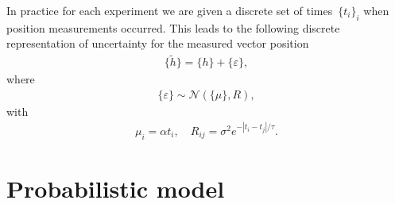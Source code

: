 \documentclass{article}
\begin{document}
In practice for each experiment we are given a discrete set of times~$\{ t_i \}_i$ when position measurements occurred. This leads to the following discrete representation of uncertainty for the measured vector position
\begin{align*}
 \{ \tilde{h} \} = \{ h \} + \{ \varepsilon \},
\end{align*}
where
\begin{align*}
 \{ \varepsilon \} \sim \mathcal{N}\left( \{ \mu \} ,  R  \right),
\end{align*}
with
\begin{align*}
 \mu_i = \alpha t_i, \quad R_{ij} = \sigma^2 e^{-|t_i-t_j|/\tau}.
\end{align*}

\section{Probabilistic model}
\end{document}
